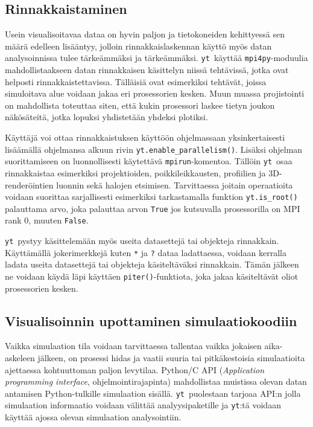 \documentclass[12pt,a4paper]{article}
\newcommand{\yt}{\texttt{yt}}
\begin{document}
\subsection{Rinnakkaistaminen}
Usein visualisoitavaa dataa on hyvin paljon ja tietokoneiden kehittyessä sen määrä edelleen lisääntyy, jolloin rinnakkaislaskennan käyttö myös datan analysoinnissa tulee tärke\-äm\-mäksi ja tärkeämmäksi. \yt\ käyttää \texttt{mpi4py}-moduulia mahdollistaakseen datan rinnakkaisen käsittelyn niissä tehtävissä, jotka ovat helposti rinnakkaistettavissa. Tälläisiä ovat esimerkiksi tehtävät, joissa simuloitava alue voidaan jakaa eri prosessorien kesken. Muun muassa projistointi on mahdollista toteuttaa siten, että kukin prosessori laskee tietyn joukon näkösäteitä, jotka lopuksi yhdistetään yhdeksi plotiksi.\cite{yt}

Käyttäjä voi ottaa rinnakkaistuksen käyttöön ohjelmassaan yksinkertaisesti lisäämällä ohjelmansa alkuun rivin \texttt{yt.enable\_parallelism()}. Lisäksi ohjelman suorittamiseen on luonnollisesti käytettävä \texttt{mpirun}-komentoa. Tällöin \yt\ osaa rinnakkaistaa esimerkiksi projektioiden, poikkileikkausten, profiilien ja 3D-renderöintien luonnin sekä halojen etsimisen. Tarvittaessa joitain operaatioita voidaan suorittaa sarjallisesti esimerkiksi tarkastamalla funktion \texttt{yt.is\_root()} palauttama arvo, joka palauttaa arvon \texttt{True} jos kutsuvalla prosessorilla on MPI rank 0, muuten \texttt{False}. \cite{yt, parallel}

\yt\ pystyy käsittelemään myös useita datasettejä tai objekteja rinnakkain. Käyttämällä jokerimerkkejä kuten \texttt{*} ja \texttt{?} dataa ladattaessa, voidaan kerralla ladata useita datasettejä tai objekteja käsiteltäväksi rinnakkain. Tämän jälkeen ne voidaan käydä läpi käyttäen \texttt{piter()}-funktiota, joka jakaa käsiteltävät oliot prosessorien kesken. \cite{parallel}%

\subsection{Visualisoinnin upottaminen simulaatiokoodiin}
Vaikka simulaation tila voidaan tarvittaessa tallentaa vaikka jokaisen aika-askeleen jälkeen, on prosessi hidas ja vaatii suuria tai pitkäkestoisia simulaatioita ajettaessa kohtuuttoman paljon levytilaa. Python/C API (\textit{Application programming interface}, ohjelmointirajapinta) mahdollistaa muistissa olevan datan antamisen Python-tulkille simulaation sisällä. \yt\ puolestaan tarjoaa API:n jolla simulaation informaatio voidaan välittää analyysipaketille ja \yt :tä voidaan käyttää ajossa olevan simulaation analysointiin. \cite{yt}
\end{document}
